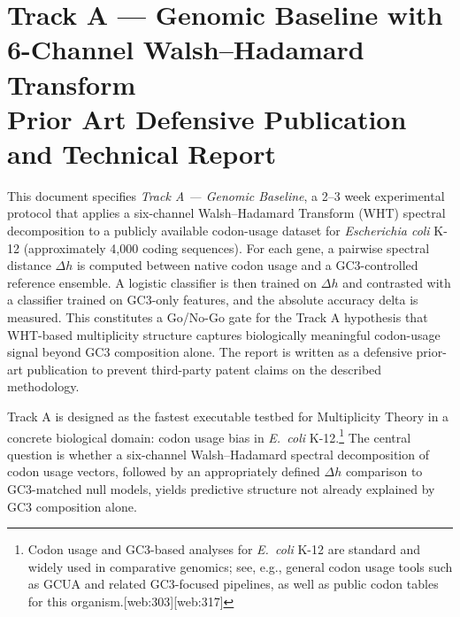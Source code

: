 \documentclass[11pt]{article}
\begin{document}
\begin{abstract}
Across all three tracks, the project provides explicit linear-algebraic and operator-norm proofs, HKDF and AEAD binding constructions, and reference implementation sketches, culminating in a coherent prior art and defensive publication package. Taken together, these results demonstrate that prime-indexed multiplicity, orthogonal spectral mixing, and native cryptographic certification can be composed into a single, recursively stable design language for biological, cryptographic, and wearable-sensing systems.
\end{abstract}
\newpage
\tableofcontents
\newpage
\section{Track A --- Genomic Baseline with 6-Channel Walsh--Hadamard Transform\\
Prior Art Defensive Publication and Technical Report}

This document specifies \emph{Track A --- Genomic Baseline}, a 2--3 week experimental protocol that applies a six-channel Walsh--Hadamard Transform (WHT) spectral decomposition to a publicly available codon-usage dataset for \emph{Escherichia coli} K-12 (approximately 4,000 coding sequences).
For each gene, a pairwise spectral distance \(\Delta h\) is computed between native codon usage and a GC3-controlled reference ensemble.
A logistic classifier is then trained on \(\Delta h\) and contrasted with a classifier trained on GC3-only features, and the absolute accuracy delta is measured.
This constitutes a Go/No-Go gate for the Track A hypothesis that WHT-based multiplicity structure captures biologically meaningful codon-usage signal beyond GC3 composition alone.
The report is written as a defensive prior-art publication to prevent third-party patent claims on the described methodology.

Track A is designed as the fastest executable testbed for Multiplicity Theory in a concrete biological domain: codon usage bias in \emph{E.~coli} K-12.\footnote{Codon usage and GC3-based analyses for \emph{E.~coli} K-12 are standard and widely used in comparative genomics; see, e.g., general codon usage tools such as GCUA and related GC3-focused pipelines, as well as public codon tables for this organism.[web:303][web:317]} 
The central question is whether a six-channel Walsh--Hadamard spectral decomposition of codon usage vectors, followed by an appropriately defined \(\Delta h\) comparison to GC3-matched null models, yields predictive structure not already explained by GC3 composition alone.
\end{document}
